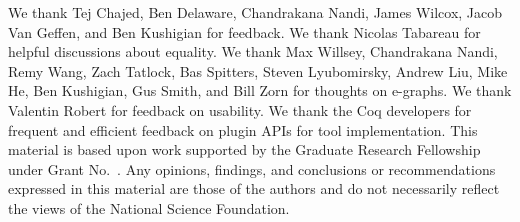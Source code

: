 \documentclass[acmsmall]{acmart}\settopmatter{printfolios=true,printccs=false,printacmref=false}
\begin{document}









\begin{acks}                            %
We thank Tej Chajed, Ben Delaware, Chandrakana Nandi, James Wilcox, Jacob Van Geffen,
and Ben Kushigian for feedback. %
We thank Nicolas Tabareau for helpful discussions about equality.
We thank Max Willsey, Chandrakana Nandi, Remy Wang, Zach Tatlock, Bas Spitters, Steven Lyubomirsky, Andrew Liu, Mike He, Ben Kushigian, 
Gus Smith, and Bill Zorn for thoughts on e-graphs.
We thank Valentin Robert for feedback on usability.
We thank the Coq developers for frequent and efficient feedback on plugin APIs for tool implementation.
This material is based upon work supported by the  Graduate Research Fellowship under Grant No.~. Any opinions, findings, and conclusions or recommendations expressed in this material are those of the authors and do not necessarily reflect the views of the National Science Foundation.
\end{acks}






\end{document}
